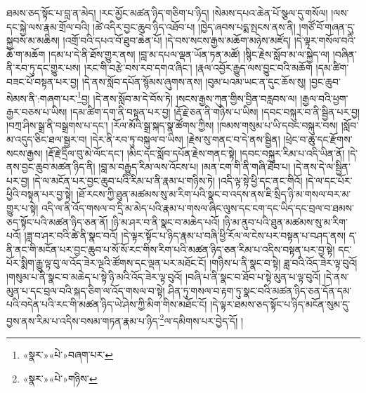 ཐམས་ཅད་སྟོང་པ་བླ་ན་མེད། །རང་མྱོང་མཚན་ཉིད་གཅིག་པ་ཉིད། །སེམས་དཔའ་ཆེན་པོ་སྩལ་དུ་གསོལ། །ལས་དང་སྐྱེ་ལས་རྣམ་གྲོལ་བའི། །ཚེ་འདིར་བྱང་ཆུབ་ཉིད་འཐོབ་པ། །ཁྱེད་ཞབས་པདྨ་སྤངས་ནས་ནི། །གཙོ་བོ་གཞན་དུ་སྐྱབས་མ་མཆིས། །འགྲོ་བའི་དཔའ་བོ་ཐུབ་ཆེན་པོ། །དེ་བས་སངས་རྒྱས་མཆོག་མཉེས་མཛོད། །དེ་ལྟར་གསོལ་བའི་ཆོ་ག་མཆོག །དམ་པ་དེ་ནི་ཐོས་གྱུར་ནས། །བླ་མ་དཔལ་ལྡན་ཡོན་ཏན་མཚོ། །སྙིང་རྗེས་སློབ་མ་ལ་སྐྱེད་ལ། །བཞིན་ནི་རབ་ཏུ་དང་གྱུར་པས། །རང་གི་བརྩེ་བས་རབ་དགའ་ཞིང་། །རྣལ་འབྱོར་རྒྱུད་ལས་བྱུང་བའི་མཆོག །དམ་ཚིག་བཟང་པོ་བསྟན་པར་བྱ། །དེ་ནས་སློབ་དཔོན་སྙོམས་ཞུགས་ནས། །བུམ་པའམ་ཡང་ན་དུང་ཆོས་སུ། །བྱང་ཆུབ་སེམས་ནི་:གཞག་པར་\footnote{«སྣར་»«པེ་»བཞག་པར་}བྱ། །དེ་ནས་སློབ་མ་དེ་བོས་ཏེ། །སངས་རྒྱས་ཀུན་གྱིས་བྱིན་བརླབས་ལ། །རྒྱལ་བའི་ཕྱག་རྒྱར་བཅས་པ་ཡིས། །དམ་ཚིག་དག་ནི་བསྟན་པར་བྱ། །རྡོ་རྗེ་ཅན་ནི་གཉིས་པ་ཡིས། །དབང་བསྐུར་བ་ནི་སྦྱིན་པར་བྱ། །བཀྲ་ཤིས་སྒྲ་ནི་བསྒྲགས་པ་དང་། །རོལ་མོའི་སྒྲ་སྐད་སྣ་ཚོགས་ཀྱིས། །ཁམས་གསུམ་པ་ཡི་དབང་བསྐུར་བས། །སློབ་མ་འདུད་ཅིང་ཐལ་སྦྱར་བ། །དེར་ནི་རབ་ཏུ་བསྐུལ་བ་ཡིས། །རྗེས་སུ་གནང་བ་དེ་ནས་སྦྱིན། །ཕྲེང་བ་ཆུ་དང་རྫོགས་སངས་རྒྱས། །རྡོ་རྗེ་དྲིལ་བུ་མེ་ལོང་དང་། །མིང་དང་སློབ་དཔོན་རྗེས་གནང་སྟེ། །དབང་བསྐུར་རིམ་པ་འདི་ཡིན་ནོ། །དེ་ནས་བྱང་ཆུབ་མཚན་ཉིད་ནི། །བླ་མ་བརྒྱུད་རིམ་ལས་འོངས་པ། །མན་ངག་གི་ནི་གཞི་ཐོབ་པ། །དེ་ནས་དེ་ལ་སྦྱིན་པར་བྱ། །དེ་ལ་མངོན་པར་བྱང་ཆུབ་པའི་རིམ་པ་ནི་རྣམ་པ་གཉིས་ཏེ། །འདི་ལྟ་སྟེ་ཕྱི་དང་ནང་གིའོ། །དེ་ལ་དང་པོར་ཕྱིའི་བསྟན་པར་བྱ་སྟེ། །ཐོ་རངས་ཀྱི་ཐུན་མཚམས་སུ་མ་རིག་པའི་སྣང་བ་འདས་ནས་ཇི་སྲིད་ཉི་མ་གསལ་བར་མ་གྱུར་པ་སྟེ། འདི་ལ་ནི་འོད་གསལ་བ་དྲི་མ་མེད་པའི་རྣམ་པ་གསལ་ཞིང་ལུས་དང་ངག་དང་ཡིད་དང་བྲལ་བ་ཐམས་ཅད་སྟོང་པའི་མཚན་ཉིད་ཅན་ནོ། །ཉི་མ་ཤར་བ་ནི་སྣང་བ་མཆེད་པའོ། །ཉི་མ་ནུབ་པའི་ཐུན་མཚམས་སུ་མ་རིག་པའོ། །ཟླ་བ་ཤར་བའི་ཚེ་ནི་སྣང་བའོ། །དེ་ལྟར་སྟོང་པ་ཉིད་རྣམ་པ་བཞི་ཕྱི་རོལ་ལ་ངེས་པར་བསྟན་པ་བཤད་ནས། ད་ནི་ནང་གི་མངོན་པར་བྱང་ཆུབ་པ་སོ་སོ་རང་གིས་རིག་པའི་མཚན་ཉིད་ཅན་རིམ་པ་འདིས་བསྟན་པར་བྱ་སྟེ། དང་པོར་སྨིག་རྒྱུ་ལྟ་བུ་ལ་འོད་ཟེར་ལྔའི་ཚོགས་དང་ལྡན་པར་མཐོང་ངོ། །གཉིས་པ་ནི་སྣང་བ་སྟེ། ཟླ་བའི་འོད་ཟེར་ལྟ་བུའོ། །གསུམ་པ་ནི་སྣང་བ་མཆེད་པ་སྟེ་ཉི་མའི་འོད་ཟེར་ལྟ་བུའོ། །བཞི་པ་ནི་སྣང་བ་ཐོབ་པ་སྟེ་མུན་པ་ལྟ་བུའོ། །དེ་ནས་མུན་པ་དང་བྲལ་བའི་སྐད་ཅིག་ལ་འོད་གསལ་བ་སྟེ། ཤིན་ཏུ་གསལ་བ་རྟག་ཏུ་སྣང་བའི་མཚན་ཉིད་ཅན་དོན་དམ་པའི་བདེན་པའི་རང་གི་མཚན་ཉིད་ཡེ་ཤེས་ཀྱི་མིག་གིས་མཐོང་ངོ། །དེ་ལྟར་ཐམས་ཅད་སྟོང་པ་ཉིད་མངོན་སུམ་དུ་བྱས་ནས་རིམ་པ་འདིས་བསམ་གཏན་རྣམ་པ་ཉིད་\footnote{«སྣར་»«པེ་»གཉིས་}ལ་དམིགས་པར་བྱེད་དོ། །
